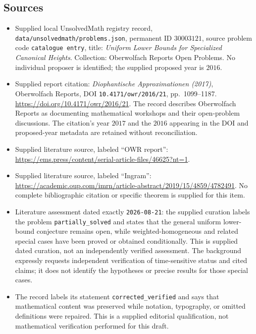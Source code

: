 \documentclass[11pt]{article}
\begin{document}
\subsection{Sources}
\begin{itemize}
\item Supplied local UnsolvedMath registry record, \texttt{data/unsolvedmath/problems.json}, permanent ID \(30003121\), source problem code \texttt{catalogue entry}, title: \emph{Uniform Lower Bounds for Specialized Canonical Heights}. Collection: Oberwolfach Reports Open Problems. No individual proposer is identified; the supplied proposed year is \(2016\).
\item Supplied report citation: \emph{Diophantische Approximationen (2017)}, Oberwolfach Reports, DOI \texttt{10.4171/owr/2016/21}, pp.\ 1099--1187. \url{https://doi.org/10.4171/owr/2016/21}. The record describes Oberwolfach Reports as documenting mathematical workshops and their open-problem discussions. The citation's year \(2017\) and the \(2016\) appearing in the DOI and proposed-year metadata are retained without reconciliation.
\item Supplied literature source, labeled ``OWR report'': \url{https://ems.press/content/serial-article-files/46625?nt=1}.
\item Supplied literature source, labeled ``Ingram'': \url{https://academic.oup.com/imrn/article-abstract/2019/15/4859/4782491}. No complete bibliographic citation or specific theorem is supplied for this item.
\item Literature assessment dated exactly \texttt{2026-08-21}: the supplied curation labels the problem \texttt{partially\_solved} and states that the general uniform lower-bound conjecture remains open, while weighted-homogeneous and related special cases have been proved or obtained conditionally. This is supplied dated curation, not an independently verified assessment. The background expressly requests independent verification of time-sensitive status and cited claims; it does not identify the hypotheses or precise results for those special cases.
\item The record labels its statement \texttt{corrected\_verified} and says that mathematical content was preserved while notation, typography, or omitted definitions were repaired. This is a supplied editorial qualification, not mathematical verification performed for this draft.
\end{itemize}
\end{document}
